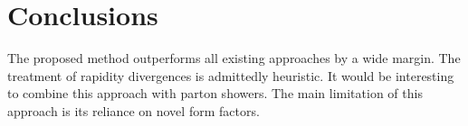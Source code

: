 \section{Conclusions}\label{sec:conclusions}

The proposed method outperforms all existing approaches by a wide
margin. The treatment of rapidity divergences is admittedly heuristic.
It would be interesting to combine this approach with parton showers.
The main limitation of this approach is its reliance on novel form
factors.


